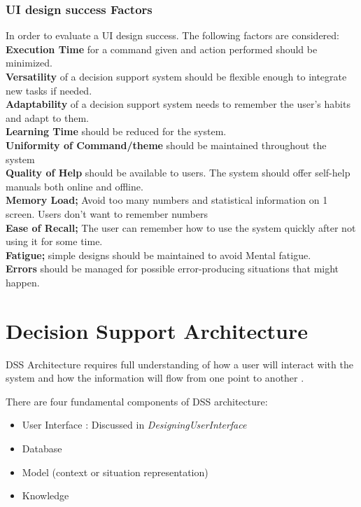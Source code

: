 \subsubsection{UI design success Factors}
In order to evaluate a UI design success. The following factors are considered:\\
\textbf{Execution Time} for a command given and action performed should be minimized.\\
\textbf{Versatility} of a decision support system should be flexible enough to integrate new tasks if needed.\\
\textbf{Adaptability} of a decision support system needs to remember the user's habits and adapt to them.\\
\textbf{Learning Time} should be reduced for the system.\\
\textbf{Uniformity of Command/theme} should be maintained throughout the system\\
\textbf{Quality of Help} should be available to users. The system should offer self-help manuals both online and offline.\\
\textbf{Memory Load;} Avoid too many numbers and statistical information on 1 screen. Users don't want to remember numbers\\
\textbf{Ease of Recall;} The user can remember how to use the system quickly after not using it for some time.\\
\textbf{Fatigue;} simple designs should be maintained to avoid Mental fatigue.\\
\textbf{Errors} should be managed for possible error-producing situations that might happen.
\section{Decision Support Architecture}
\label{sec:DecisionSupportArchitecture}
DSS Architecture requires full understanding of how a user will interact with the system and how the information will flow from one point to another \cite{DSS}.

There are four fundamental components of DSS architecture:
\begin{itemize}
	\item User Interface : Discussed in \textit{DesigningUserInterface}
	\item Database
	\item Model (context or situation representation)
	\item Knowledge
\end{itemize}


